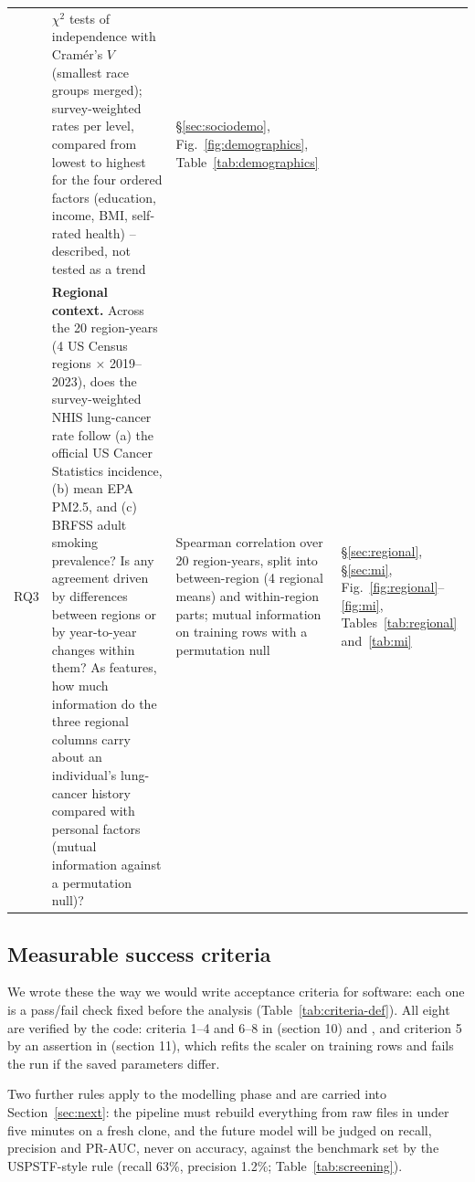 \begin{table}[htbp]
\begin{tabularx}{\textwidth}{@{}l >{\raggedright\arraybackslash}X >{\raggedright\arraybackslash}p{4.1cm} >{\raggedright\arraybackslash}p{2.2cm}@{}}
 & $\chi^2$ tests of independence with Cram\'er's $V$ (smallest race groups merged); survey-weighted rates per level, compared from lowest to highest for the four ordered factors (education, income, BMI, self-rated health) -- described, not tested as a trend
 & \S\ref{sec:sociodemo}, Fig.~\ref{fig:demographics}, Table~\ref{tab:demographics} \\
\addlinespace
RQ3 & \textbf{Regional context.} Across the 20 region-years (4 US Census regions $\times$ 2019--2023), does the survey-weighted NHIS lung-cancer rate follow (a) the official US Cancer Statistics incidence, (b) mean EPA PM2.5, and (c) BRFSS adult smoking prevalence? Is any agreement driven by differences between regions or by year-to-year changes within them? As features, how much information do the three regional columns carry about an individual's lung-cancer history compared with personal factors (mutual information against a permutation null)?
 & Spearman correlation over 20 region-years, split into between-region (4 regional means) and within-region parts; mutual information on training rows with a permutation null
 & \S\ref{sec:regional}, \S\ref{sec:mi}, Fig.~\ref{fig:regional}--\ref{fig:mi}, Tables~\ref{tab:regional} and~\ref{tab:mi} \\
\bottomrule
\end{tabularx}
\end{table}

\subsection{Measurable success criteria}\label{sec:criteria}

We wrote these the way we would write acceptance criteria for software: each one is a pass/fail check fixed before the analysis (Table~\ref{tab:criteria-def}). All eight are verified by the code: criteria 1--4 and 6--8 in  (section 10) and , and criterion 5 by an assertion in  (section 11), which refits the scaler on training rows and fails the run if the saved parameters differ.

Two further rules apply to the modelling phase and are carried into Section~\ref{sec:next}: the pipeline must rebuild everything from raw files in under five minutes on a fresh clone, and the future model will be judged on recall, precision and PR-AUC, never on accuracy, against the benchmark set by the USPSTF-style rule (recall 63\%, precision 1.2\%; Table~\ref{tab:screening}).

